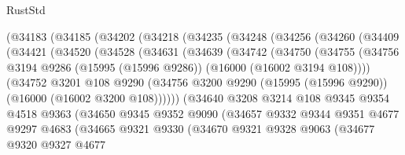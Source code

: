 \begin{lexlean}{RustStd}
\begin{coremodule}
      (@34183
        (@34185
          (@34202
            (@34218
              (@34235
                (@34248
                  (@34256
                    (@34260
                      (@34409
                        (@34421
                          (@34520
                            (@34528
                              (@34631
                                (@34639
                                  (@34742
                                    (@34750
                                      (@34755
                                        (@34756
                                          @3194
                                          @9286
                                          (@15995 (@15996 @9286))
                                          (@16000 (@16002 @3194 @108))))
                                      (@34752
                                        @3201
                                        @108
                                        @9290
                                        (@34756
                                          @3200
                                          @9290
                                          (@15995 (@15996 @9290))
                                          (@16000 (@16002 @3200 @108))))))
                                  (@34640
                                    @3208
                                    @3214
                                    @108
                                    @9345
                                    @9354
                                    @4518
                                    @9363
                                    (@34650
                                      @9345
                                      @9352
                                      @9090
                                      (@34657
                                        @9332
                                        @9344
                                        @9351
                                        @4677
                                        @9297
                                        @4683
                                        (@34665
                                          @9321
                                          @9330
                                          (@34670
                                            @9321
                                            @9328
                                            @9063
                                            (@34677
                                              @9320
                                              @9327
                                              @4677

\end{coremodule}
\end{lexlean}
